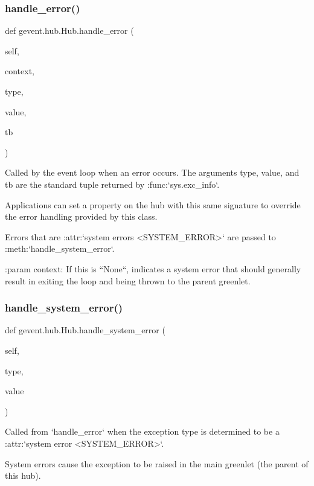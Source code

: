 \subsubsection{\texorpdfstring{handle\+\_\+error()}{handle\_error()}}
{\footnotesize\ttfamily def gevent.\+hub.\+Hub.\+handle\+\_\+error (\begin{DoxyParamCaption}\item[{}]{self,  }\item[{}]{context,  }\item[{}]{type,  }\item[{}]{value,  }\item[{}]{tb }\end{DoxyParamCaption})}

\begin{DoxyVerb}Called by the event loop when an error occurs. The arguments
type, value, and tb are the standard tuple returned by :func:`sys.exc_info`.

Applications can set a property on the hub with this same signature
to override the error handling provided by this class.

Errors that are :attr:`system errors <SYSTEM_ERROR>` are passed
to :meth:`handle_system_error`.

:param context: If this is ``None``, indicates a system error that
    should generally result in exiting the loop and being thrown to the
    parent greenlet.
\end{DoxyVerb}
 \mbox{\label{classgevent_1_1hub_1_1_hub_a3ebc2352e96b888d64899c5b5e9ac758}} 
\subsubsection{\texorpdfstring{handle\+\_\+system\+\_\+error()}{handle\_system\_error()}}
{\footnotesize\ttfamily def gevent.\+hub.\+Hub.\+handle\+\_\+system\+\_\+error (\begin{DoxyParamCaption}\item[{}]{self,  }\item[{}]{type,  }\item[{}]{value }\end{DoxyParamCaption})}

\begin{DoxyVerb}Called from `handle_error` when the exception type is determined
to be a :attr:`system error <SYSTEM_ERROR>`.

System errors cause the exception to be raised in the main
greenlet (the parent of this hub).
\end{DoxyVerb}
 \mbox{\label{classgevent_1_1hub_1_1_hub_a56429a4dd8bdc99bda65aeeba20aeba9}} 
